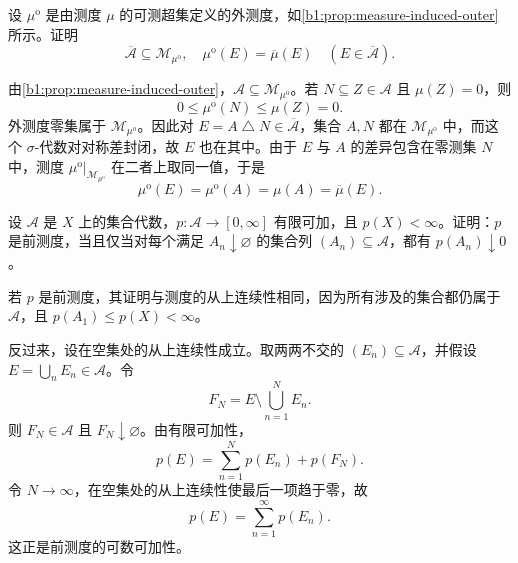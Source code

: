 \begin{exercise}
\label{b1:ex:0206}
设 \(\mu^{\mathrm o}\) 是由测度 \(\mu\) 的可测超集定义的外测度，如\cref{b1:prop:measure-induced-outer}所示。证明
\[
\overline{\mathcal A}\subseteq\mathcal M_{\mu^{\mathrm o}},
\quad
\mu^{\mathrm o}(E)=\overline\mu(E)\quad(E\in\overline{\mathcal A}).
\]
\end{exercise}
\begin{solution}
由\cref{b1:prop:measure-induced-outer}，\(\mathcal A\subseteq\mathcal M_{\mu^{\mathrm o}}\)。若 \(N\subseteq Z\in\mathcal A\) 且 \(\mu(Z)=0\)，则
\[
0\leq\mu^{\mathrm o}(N)\leq\mu(Z)=0.
\]
外测度零集属于 \(\mathcal M_{\mu^{\mathrm o}}\)。因此对 \(E=A\mathbin{\triangle}N\in\overline{\mathcal A}\)，集合 \(A,N\) 都在 \(\mathcal M_{\mu^{\mathrm o}}\) 中，而这个 \(\sigma\)-代数对对称差封闭，故 \(E\) 也在其中。由于 \(E\) 与 \(A\) 的差异包含在零测集 \(N\) 中，测度 \(\mu^{\mathrm o}|_{\mathcal M_{\mu^{\mathrm o}}}\) 在二者上取同一值，于是
\[
\mu^{\mathrm o}(E)=\mu^{\mathrm o}(A)=\mu(A)=\overline\mu(E).
\]
\end{solution}

\begin{exercise}
\label{b1:ex:0207}
设 \(\mathcal A\) 是 \(X\) 上的集合代数，\(p:\mathcal A\to[0,\infty]\) 有限可加，且 \(p(X)<\infty\)。证明：\(p\) 是前测度，当且仅当对每个满足 \(A_n\downarrow\varnothing\) 的集合列 \((A_n)\subseteq\mathcal A\)，都有 \(p(A_n)\downarrow0\)。
\end{exercise}
\begin{solution}
若 \(p\) 是前测度，其证明与测度的从上连续性相同，因为所有涉及的集合都仍属于 \(\mathcal A\)，且 \(p(A_1)\leq p(X)<\infty\)。

反过来，设在空集处的从上连续性成立。取两两不交的 \((E_n)\subseteq\mathcal A\)，并假设 \(E=\bigcup_nE_n\in\mathcal A\)。令
\[
F_N=E\setminus\bigcup_{n=1}^{N}E_n.
\]
则 \(F_N\in\mathcal A\) 且 \(F_N\downarrow\varnothing\)。由有限可加性，
\[
p(E)=\sum_{n=1}^{N}p(E_n)+p(F_N).
\]
令 \(N\to\infty\)，在空集处的从上连续性使最后一项趋于零，故
\[
p(E)=\sum_{n=1}^{\infty}p(E_n).
\]
这正是前测度的可数可加性。
\end{solution}


